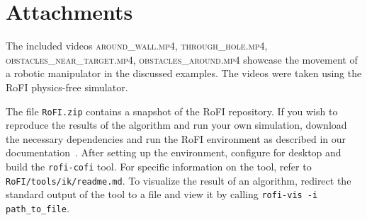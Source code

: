 \appendix %

\chapter{Attachments}

The included videos \textsc{around\_wall.mp4}, \textsc{through\_hole.mp4}, \textsc{obstacles\_near\_target.mp4}, \textsc{obstacles\_around.mp4} showcase the movement of a robotic manipulator in the discussed examples. The videos were taken using the RoFI physics-free simulator.

The file \texttt{RoFI.zip} contains a snapshot of the RoFI repository.
If you wish to reproduce the results of the algorithm and run your own simulation, download the necessary dependencies and run the RoFI environment as described in our documentation~\cite{documentation}.
After setting up the environment, configure for desktop and build the \texttt{rofi-cofi} tool.
For specific information on the tool, refer to \texttt{RoFI/tools/ik/readme.md}. To visualize the result of an algorithm, redirect the standard output of the tool to a file and view it by calling \texttt{rofi-vis -i path\_to\_file}.
